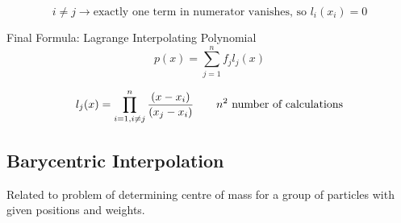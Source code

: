 \begin{itemize}
    \[i \neq j \rightarrow \text{exactly one term in numerator vanishes, so } l_i(x_i) = 0 \]


    \begin{thmbox}{Final Formula: Lagrange Interpolating Polynomial}
        \begin{equation}
            p(x) = \sum_{j=1}^n f_j l_j(x)
        \end{equation}

        \begin{equation}
            l_j(x) = \prod_{i=1, \space i \neq j}^n \frac{(x-x_i)}{(x_j-x_i)} \qquad \text{$n^2$ number of calculations}
        \end{equation}
    \end{thmbox}
    
\end{itemize}
\subsection{Barycentric Interpolation}

Related to problem of determining centre of mass for a group of particles with given positions and weights.

